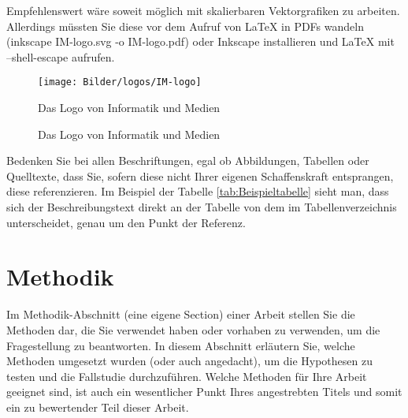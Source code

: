 Empfehlenswert wäre soweit möglich mit skalierbaren Vektorgrafiken zu arbeiten. Allerdings müssten Sie diese vor dem Aufruf von LaTeX in PDFs wandeln (inkscape IM-logo.svg -o IM-logo.pdf) oder Inkscape installieren und LaTeX mit --shell-escape aufrufen.

\begin{figure}[!t]
    \centering
    \texttt{[image: Bilder/logos/IM-logo]}
    \caption{Das Logo von Informatik und Medien }
\end{figure}

\begin{figure}[!t]
    \centering
    
    \caption{Das Logo von Informatik und Medien }
\end{figure}

Bedenken Sie bei allen Beschriftungen, egal ob Abbildungen, Tabellen oder Quelltexte, dass Sie, sofern diese nicht Ihrer eigenen Schaffenskraft entsprangen,
diese referenzieren. Im Beispiel der Tabelle \ref{tab:Beispieltabelle} sieht man, dass sich der Beschreibungstext direkt an der Tabelle von dem im Tabellenverzeichnis unterscheidet,
genau um den Punkt der Referenz.

\section{Methodik}

Im Methodik-Abschnitt (eine eigene Section) einer Arbeit stellen Sie die Methoden dar, die Sie verwendet haben oder vorhaben zu verwenden, um die Fragestellung zu beantworten. 
In diesem Abschnitt erläutern Sie, welche Methoden umgesetzt wurden (oder auch angedacht), um die Hypothesen zu testen und die Fallstudie durchzuführen. 
Welche Methoden für Ihre Arbeit geeignet sind, ist auch ein wesentlicher Punkt Ihres angestrebten Titels und somit ein zu bewertender Teil dieser Arbeit. 

